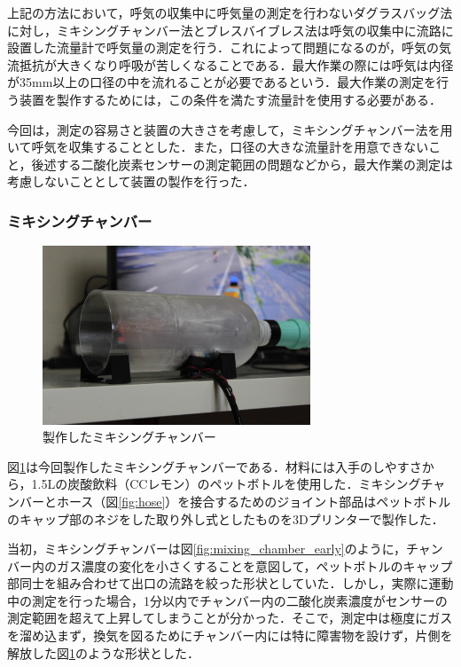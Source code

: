 上記の方法において，呼気の収集中に呼気量の測定を行わないダグラスバッグ法に対し，ミキシングチャンバー法とブレスバイブレス法は呼気の収集中に流路に設置した流量計で呼気量の測定を行う．これによって問題になるのが，呼気の気流抵抗が大きくなり呼吸が苦しくなることである．最大作業の際には呼気は内径が35mm以上の口径の中を流れることが必要であるという\cite{science_of_vo2}．最大作業の測定を行う装置を製作するためには，この条件を満たす流量計を使用する必要がある．

今回は，測定の容易さと装置の大きさを考慮して，ミキシングチャンバー法を用いて呼気を収集することとした．また，口径の大きな流量計を用意できないこと，後述する二酸化炭素センサーの測定範囲の問題などから，最大作業の測定は考慮しないこととして装置の製作を行った．

\subsubsection{ミキシングチャンバー}

\begin{figure}[H]
  \begin{center}
    \includegraphics[width=8cm]{fig/mixing_chamber}
    \caption{製作したミキシングチャンバー}
    \label{fig:mixing_chamber}
  \end{center}
\end{figure}

図\ref{fig:mixing_chamber}は今回製作したミキシングチャンバーである．材料には入手のしやすさから，1.5Lの炭酸飲料（CCレモン）のペットボトルを使用した．ミキシングチャンバーとホース（図\ref{fig:hose}）を接合するためのジョイント部品はペットボトルのキャップ部のネジをした取り外し式としたものを3Dプリンターで製作した．

当初，ミキシングチャンバーは図\ref{fig:mixing_chamber_early}のように，チャンバー内のガス濃度の変化を小さくすることを意図して，ペットボトルのキャップ部同士を組み合わせて出口の流路を絞った形状としていた．しかし，実際に運動中の測定を行った場合，1分以内でチャンバー内の二酸化炭素濃度がセンサーの測定範囲を超えて上昇してしまうことが分かった．そこで，測定中は極度にガスを溜め込まず，換気を図るためにチャンバー内には特に障害物を設けず，片側を解放した図\ref{fig:mixing_chamber}のような形状とした．

